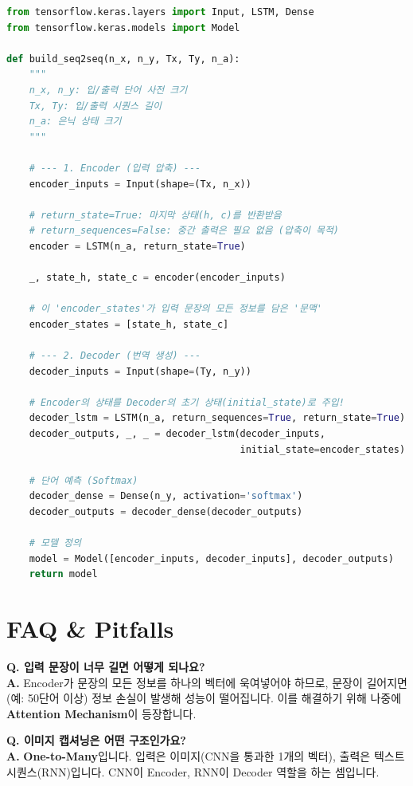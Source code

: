 \documentclass[11pt,a4paper]{book}
\theoremstyle{definition}
\begin{document}
\begin{lstlisting}[language=Python, caption=Encoder-Decoder Implementation, breaklines=true]
from tensorflow.keras.layers import Input, LSTM, Dense
from tensorflow.keras.models import Model

def build_seq2seq(n_x, n_y, Tx, Ty, n_a):
    """
    n_x, n_y: 입/출력 단어 사전 크기
    Tx, Ty: 입/출력 시퀀스 길이
    n_a: 은닉 상태 크기
    """
    
    # --- 1. Encoder (입력 압축) ---
    encoder_inputs = Input(shape=(Tx, n_x))
    
    # return_state=True: 마지막 상태(h, c)를 반환받음
    # return_sequences=False: 중간 출력은 필요 없음 (압축이 목적)
    encoder = LSTM(n_a, return_state=True)
    
    _, state_h, state_c = encoder(encoder_inputs)
    
    # 이 'encoder_states'가 입력 문장의 모든 정보를 담은 '문맥'
    encoder_states = [state_h, state_c]
    
    # --- 2. Decoder (번역 생성) ---
    decoder_inputs = Input(shape=(Ty, n_y))
    
    # Encoder의 상태를 Decoder의 초기 상태(initial_state)로 주입!
    decoder_lstm = LSTM(n_a, return_sequences=True, return_state=True)
    decoder_outputs, _, _ = decoder_lstm(decoder_inputs, 
                                         initial_state=encoder_states)
    
    # 단어 예측 (Softmax)
    decoder_dense = Dense(n_y, activation='softmax')
    decoder_outputs = decoder_dense(decoder_outputs)
    
    # 모델 정의
    model = Model([encoder_inputs, decoder_inputs], decoder_outputs)
    return model
\end{lstlisting}

\section{FAQ \& Pitfalls}

\textbf{Q. 입력 문장이 너무 길면 어떻게 되나요?} \\
\textbf{A.} Encoder가 문장의 모든 정보를 하나의 벡터에 욱여넣어야 하므로, 문장이 길어지면(예: 50단어 이상) 정보 손실이 발생해 성능이 떨어집니다. 이를 해결하기 위해 나중에 \textbf{Attention Mechanism}이 등장합니다.

\textbf{Q. 이미지 캡셔닝은 어떤 구조인가요?} \\
\textbf{A.} \textbf{One-to-Many}입니다. 입력은 이미지(CNN을 통과한 1개의 벡터), 출력은 텍스트 시퀀스(RNN)입니다. CNN이 Encoder, RNN이 Decoder 역할을 하는 셈입니다.
\end{document}
